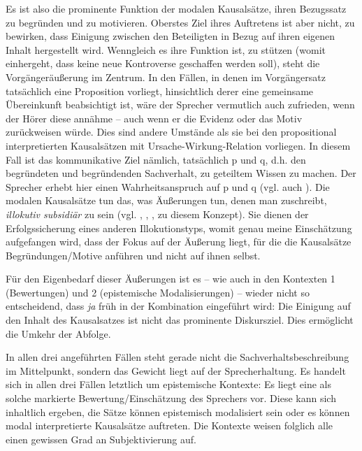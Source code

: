 Es ist also die prominente Funktion der modalen Kausalsätze, ihren Bezugssatz zu begründen und zu motivieren. Oberstes Ziel ihres Auftretens ist aber nicht, zu bewirken, dass Einigung zwischen den Beteiligten in Bezug auf ihren eigenen Inhalt hergestellt wird. Wenngleich es ihre Funktion ist, zu stützen (womit einhergeht, dass keine neue Kontroverse geschaffen werden soll), steht die Vorgänger\-äußerung im Zentrum. In den Fällen, in denen im Vorgängersatz tatsächlich eine Proposition vorliegt, hinsichtlich derer eine gemeinsame Übereinkunft beabsichtigt ist, wäre der Sprecher vermutlich auch zufrieden, wenn der Hörer diese annähme – auch wenn er die Evidenz oder das Motiv zurückweisen würde. Dies sind andere Umstände als sie bei den propositional interpretierten Kausalsätzen mit Ursache-Wirkung-Relation vorliegen. In diesem Fall ist das kommunikative Ziel nämlich, tatsächlich p und q, d.h. den begründeten und begründenden Sachverhalt, zu geteiltem Wissen zu machen. Der Sprecher erhebt hier einen Wahrheitsanspruch auf p und q (vgl. auch \citealt[140]{Pasch1999}). Die modalen Kausalsätze tun das, was Äußerungen tun, denen man zuschreibt, \textit{illokutiv subsidiär}  zu sein (vgl. \citealt[58]{Motsch1987}, \citealt[21]{Brandt1992a}, \citealt[54]{Pittner2007}, \citealt[178]{Pittner2011} zu diesem Konzept). Sie dienen der Erfolgssicherung eines anderen  Illokutionstyps, womit genau meine Einschätzung aufgefangen wird, dass der Fokus auf der Äußerung liegt, für die die Kausalsätze Begründungen/Motive anführen und nicht auf ihnen selbst.
	
Für den Eigenbedarf dieser Äußerungen ist es – wie auch in den Kontexten 1 (Bewertungen) und 2 (epistemische Modalisierungen) – wieder nicht so entscheidend, dass \textit{ja} früh in der Kombination eingeführt wird: Die Einigung auf den Inhalt des Kausalsatzes ist nicht das prominente Diskursziel. Dies ermöglicht die Umkehr der Abfolge. 
	
In allen drei angeführten Fällen steht gerade nicht die Sachverhaltsbeschreibung im Mittelpunkt, sondern das Gewicht liegt auf der Sprecherhaltung. Es handelt sich in allen drei Fällen letztlich um epistemische Kontexte: Es liegt eine als solche markierte Bewertung/Einschätzung des Sprechers vor. Diese kann sich inhaltlich ergeben, die Sätze können epistemisch modalisiert sein oder es können modal interpretierte Kausalsätze auftreten. Die Kontexte weisen folglich alle einen gewissen Grad an Subjektivierung  auf.

